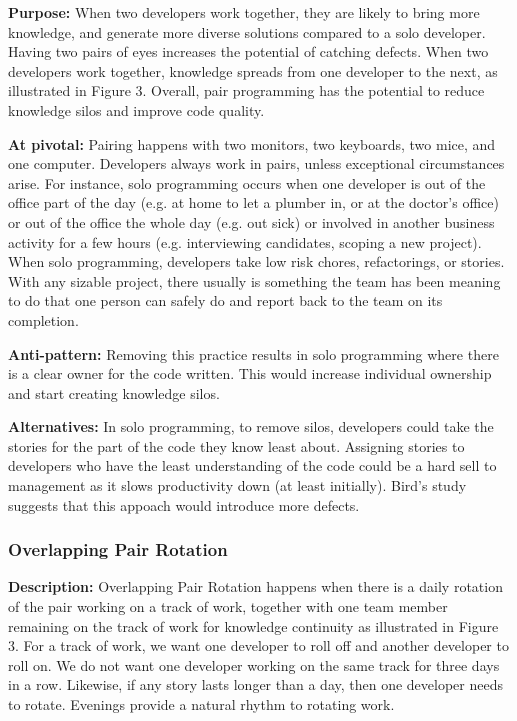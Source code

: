 \begin{table}[]
\textbf{Purpose:} When two developers work together, they are likely to bring more knowledge, and generate more diverse solutions compared to a solo developer. Having two pairs of eyes increases the potential of catching defects. When two developers work together, knowledge spreads from one developer to the next, as illustrated in Figure 3. Overall, pair programming has the potential to reduce knowledge silos and improve code quality.

\textbf{At pivotal:} Pairing happens with two monitors, two keyboards, two mice, and one computer. Developers always work in pairs, unless exceptional circumstances arise. For instance, solo programming occurs when one developer is out of the office part of the day (e.g. at home to let a plumber in, or at the doctor's office) or out of the office the whole day (e.g. out sick) or involved in another business activity for a few hours (e.g. interviewing candidates, scoping a new project). When solo programming, developers take low risk chores, refactorings, or stories. With any sizable project, there usually is something the team has been meaning to do that one person can safely do and report back to the team on its completion.  

\textbf{Anti-pattern:} Removing this practice results in solo programming where there is a clear owner for the code written. This would increase individual ownership and start creating knowledge silos. 

\textbf{Alternatives:}  In solo programming, to remove silos, developers could take the stories for the part of the code they know least about. Assigning stories to developers who have the least understanding of the code could be a hard sell to management as it slows productivity down (at least initially). Bird's study \cite{BirdDontTouchMyCode} suggests that this appoach would introduce more defects. 

\subsubsection{Overlapping Pair Rotation}
\textbf{Description:} Overlapping Pair Rotation happens when there is a daily rotation of the pair working on a track of work, together with one team member remaining on the track of work for knowledge continuity as illustrated in Figure 3. For a track of work, we want one developer to roll off and another developer to roll on.  We do not want one developer working on the same track for three days in a row. Likewise, if any story lasts longer than a day, then one developer needs to rotate. Evenings provide a natural rhythm to rotating work. 


\end{table}
